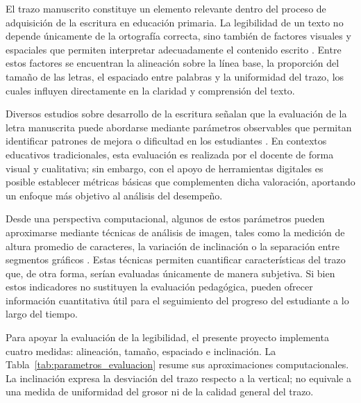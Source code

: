 El trazo manuscrito constituye un elemento relevante dentro del proceso de adquisición de la escritura en educación primaria. La legibilidad de un texto no depende únicamente de la ortografía correcta, sino también de factores visuales y espaciales que permiten interpretar adecuadamente el contenido escrito \cite{graham2006dimensions, rosenblum2003product}. Entre estos factores se encuentran la alineación sobre la línea base, la proporción del tamaño de las letras, el espaciado entre palabras y la uniformidad del trazo, los cuales influyen directamente en la claridad y comprensión del texto.

Diversos estudios sobre desarrollo de la escritura señalan que la evaluación de la letra manuscrita puede abordarse mediante parámetros observables que permitan identificar patrones de mejora o dificultad en los estudiantes \cite{berninger2010teaching, graham2010handwriting}. En contextos educativos tradicionales, esta evaluación es realizada por el docente de forma visual y cualitativa; sin embargo, con el apoyo de herramientas digitales es posible establecer métricas básicas que complementen dicha valoración, aportando un enfoque más objetivo al análisis del desempeño.

Desde una perspectiva computacional, algunos de estos parámetros pueden aproximarse mediante técnicas de análisis de imagen, tales como la medición de altura promedio de caracteres, la variación de inclinación o la separación entre segmentos gráficos \cite{marti2002iam, plamondon2000online}. Estas técnicas permiten cuantificar características del trazo que, de otra forma, serían evaluadas únicamente de manera subjetiva. Si bien estos indicadores no sustituyen la evaluación pedagógica, pueden ofrecer información cuantitativa útil para el seguimiento del progreso del estudiante a lo largo del tiempo.

Para apoyar la evaluación de la legibilidad, el presente proyecto implementa cuatro medidas: alineación, tamaño, espaciado e inclinación. La Tabla~\ref{tab:parametros_evaluacion} resume sus aproximaciones computacionales. La inclinación expresa la desviación del trazo respecto a la vertical; no equivale a una medida de uniformidad del grosor ni de la calidad general del trazo.

